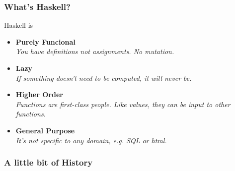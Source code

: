 \documentclass{beamer}
\begin{document}
  


\begin{frame}[t]
  \frametitle{What's Haskell?}
  
  Haskell is
  \begin{itemize}
  \item{\bf Purely Funcional} \\
    \textit{You have definitions not assignments. No mutation.}
  \item{\bf Lazy} \\
    \textit{If something doesn't need to be computed, it will never be.}
  \item{\bf Higher Order} \\
    \textit{Functions are first-class people. Like values, they can be input to other functions.}
  \item{\bf General Purpose} \\
    \textit{It's not specific to any domain, e.g. SQL or html.}
  \end{itemize}
\end{frame}

\begin{frame}[t]
  \frametitle{A little bit of History}
  
\end{frame}
\end{document}
